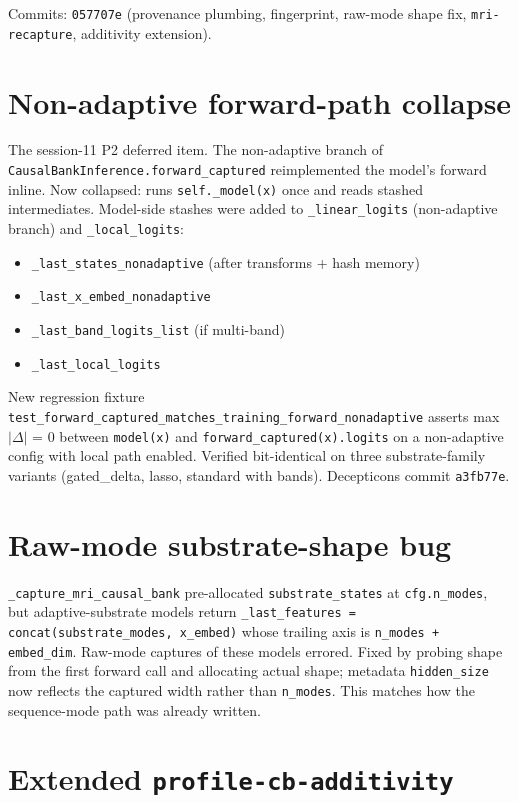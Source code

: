 \documentclass[11pt,openany]{book}
\begin{document}
Commits: \texttt{057707e} (provenance plumbing, fingerprint, raw-mode shape
fix, \texttt{mri-recapture}, additivity extension).

\section{Non-adaptive forward-path collapse}

The session-11 P2 deferred item. The non-adaptive branch of
\texttt{CausalBankInference.forward\_captured} reimplemented the model's
forward inline. Now collapsed: runs \texttt{self.\_model(x)} once and reads
stashed intermediates. Model-side stashes were added to
\texttt{\_linear\_logits} (non-adaptive branch) and \texttt{\_local\_logits}:

\begin{itemize}
  \item \texttt{\_last\_states\_nonadaptive} (after transforms + hash memory)
  \item \texttt{\_last\_x\_embed\_nonadaptive}
  \item \texttt{\_last\_band\_logits\_list} (if multi-band)
  \item \texttt{\_last\_local\_logits}
\end{itemize}

New regression fixture
\texttt{test\_forward\_captured\_matches\_training\_forward\_nonadaptive}
asserts max$|\Delta|$ = 0 between \texttt{model(x)} and
\texttt{forward\_captured(x).logits} on a non-adaptive config with local
path enabled. Verified bit-identical on three substrate-family variants
(gated\_delta, lasso, standard with bands). Decepticons commit
\texttt{a3fb77e}.

\section{Raw-mode substrate-shape bug}

\texttt{\_capture\_mri\_causal\_bank} pre-allocated \texttt{substrate\_states}
at \texttt{cfg.n\_modes}, but adaptive-substrate models return
\texttt{\_last\_features = concat(substrate\_modes, x\_embed)} whose trailing
axis is \texttt{n\_modes + embed\_dim}. Raw-mode captures of these models
errored. Fixed by probing shape from the first forward call and allocating
actual shape; metadata \texttt{hidden\_size} now reflects the captured width
rather than \texttt{n\_modes}. This matches how the sequence-mode path was
already written.

\section{Extended \texttt{profile-cb-additivity}}
\end{document}
